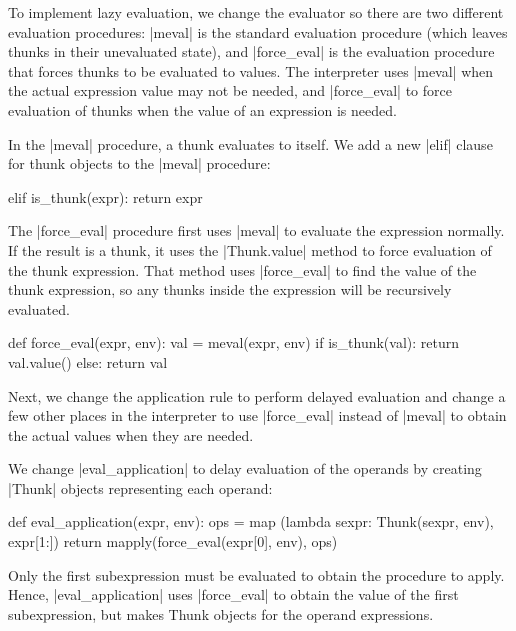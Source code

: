  To implement lazy evaluation, we change the evaluator so there are two different evaluation procedures: \pycode|meval| is the standard evaluation procedure (which leaves thunks in their unevaluated state), and \pycode|force_eval| is the evaluation procedure that forces thunks to be evaluated to values.  The interpreter uses \pycode|meval| when the actual expression value may not be needed, and \pycode|force_eval| to force evaluation of thunks when the value of an expression is needed.  

In the \pycode|meval| procedure, a thunk evaluates to itself.  We add a new \pycode|elif| clause for thunk objects to the \pycode|meval| procedure:
\begin{pythoncode}
    elif is_thunk(expr):	return expr 
\end{pythoncode}

The \pycode|force_eval| procedure first uses \pycode|meval| to evaluate the expression normally.  If the result is a thunk, it uses the \pycode|Thunk.value| method to force evaluation of the thunk expression.  That method uses \pycode|force_eval| to find the value of the thunk expression, so any thunks inside the expression will be recursively evaluated.

\begin{pythoncode}
def force_eval(expr, env):
    val = meval(expr, env)
    if is_thunk(val): return val.value() 
    else: return val
\end{pythoncode}

Next, we change the application rule to perform delayed evaluation and change a few other places in the interpreter to use \pycode|force_eval| instead of \pycode|meval| to obtain the actual values when they are needed.

We change \pycode|eval_application| to delay evaluation of the operands by creating \pycode|Thunk| objects representing each operand:

\begin{pythoncode}
def eval_application(expr, env):
    ops = map (lambda sexpr: Thunk(sexpr, env), expr[1:])
    return mapply(force_eval(expr[0], env), ops)
\end{pythoncode}

Only the first subexpression must be evaluated to obtain the procedure to apply.  Hence, \pycode|eval_application| uses \pycode|force_eval| to obtain the value of the first subexpression, but makes Thunk objects for the operand expressions.

